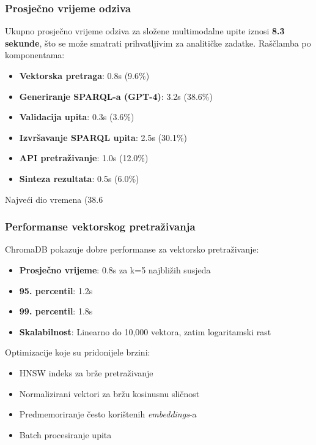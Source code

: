\subsubsection{Prosječno vrijeme odziva}

Ukupno prosječno vrijeme odziva za složene multimodalne upite iznosi \textbf{8.3 sekunde}, što se može smatrati prihvatljivim za analitičke zadatke. Raščlamba po komponentama:

\begin{itemize}
    \item \textbf{Vektorska pretraga}: 0.8s (9.6\%)
    \item \textbf{Generiranje SPARQL-a (GPT-4)}: 3.2s (38.6\%)
    \item \textbf{Validacija upita}: 0.3s (3.6\%)
    \item \textbf{Izvršavanje SPARQL upita}: 2.5s (30.1\%)
    \item \textbf{API pretraživanje}: 1.0s (12.0\%)
    \item \textbf{Sinteza rezultata}: 0.5s (6.0\%)
\end{itemize}

Najveći dio vremena (38.6%

\subsubsection{Performanse vektorskog pretraživanja}

ChromaDB pokazuje dobre performanse za vektorsko pretraživanje:

\begin{itemize}
    \item \textbf{Prosječno vrijeme}: 0.8s za k=5 najbližih susjeda
    \item \textbf{95. percentil}: 1.2s
    \item \textbf{99. percentil}: 1.8s
    \item \textbf{Skalabilnost}: Linearno do 10,000 vektora, zatim logaritamski rast
\end{itemize}

Optimizacije koje su pridonijele brzini:
\begin{itemize}
    \item HNSW indeks za brže pretraživanje
    \item Normalizirani vektori za bržu kosinusnu sličnost
    \item Predmemoriranje često korištenih \textit{embeddings}-a
    \item Batch procesiranje upita
\end{itemize}

